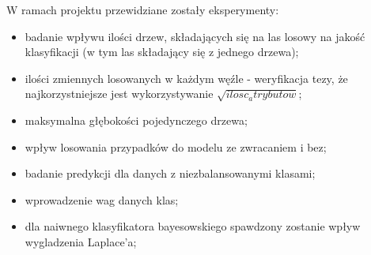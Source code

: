 W ramach projektu przewidziane zostały eksperymenty:
\begin{itemize}
    \item badanie wpływu ilości drzew, składających się na las losowy na jakość klasyfikacji (w tym las składający się z jednego drzewa);
    \item ilości zmiennych losowanych w każdym węźle - weryfikacja tezy, że najkorzystniejsze jest wykorzystywanie $\sqrt {ilosc_atrybutow}$;
    \item maksymalna głębokości pojedynczego drzewa;
    \item wpływ losowania przypadków do modelu ze zwracaniem i bez;
    \item badanie predykcji dla danych z niezbalansowanymi klasami;
        \item wprowadzenie wag danych klas;
        \item dla naiwnego klasyfikatora bayesowskiego spawdzony zostanie wpływ wygladzenia Laplace'a;
        
\end{itemize}
